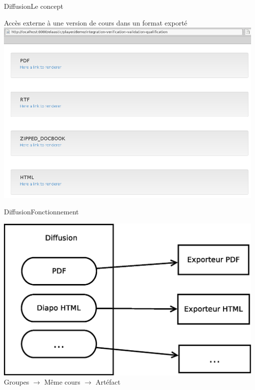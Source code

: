 \documentclass[xcolor=x11names,compress]{beamer}
\renewcommand{\(}{\begin{columns}}
\renewcommand{\)}{\end{columns}}
\newcommand{\<}[1]{\begin{column}{#1}}
\renewcommand{\>}{\end{column}}
\begin{document}
\begin{frame}{Diffusion}{Le concept}
  \begin{center}
	Accès externe à une version de cours dans un format exporté
	\vfill
	\includegraphics[scale=0.22]{images/diffusion}
  \end{center}
\end{frame}

\begin{frame}{Diffusion}{Fonctionnement}
  \begin{center}
	\includegraphics[scale=0.25]{images/diffusion_schema}
	\vfill
	\pause
	Groupes $\rightarrow$ Même cours $\rightarrow$ Artéfact
  \end{center}
\end{frame}
\end{document}
